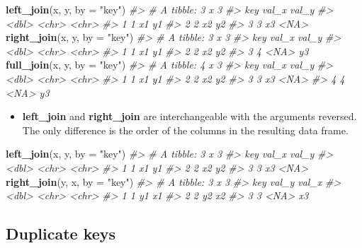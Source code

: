 \documentclass[]{book}
\newenvironment{Shaded}{\begin{snugshade}}{\end{snugshade}}
\newcommand{\CommentTok}[1]{\textcolor[rgb]{0.56,0.35,0.01}{\textit{#1}}}
\newcommand{\DataTypeTok}[1]{\textcolor[rgb]{0.13,0.29,0.53}{#1}}
\newcommand{\KeywordTok}[1]{\textcolor[rgb]{0.13,0.29,0.53}{\textbf{#1}}}
\newcommand{\NormalTok}[1]{#1}
\newcommand{\StringTok}[1]{\textcolor[rgb]{0.31,0.60,0.02}{#1}}
\newenvironment{rmdblock}[1]
  {\begin{shaded*}
  \begin{itemize}
  \renewcommand{\labelitemi}{
    \raisebox{-.7\height}[0pt][0pt]{
      {\setkeys{Gin}{width=3em,keepaspectratio}\texttt{[image: images/\#1]}}
    }
  }
  \item
  }
  {
  \end{itemize}
  \end{shaded*}
  }
\newenvironment{rmdnote}
  {\begin{rmdblock}{note}}
  {\end{rmdblock}}
\theoremstyle{definition}
\theoremstyle{definition}
\theoremstyle{definition}
\theoremstyle{remark}
\begin{document}
\begin{Shaded}
\begin{Highlighting}[]
\KeywordTok{left_join}\NormalTok{(x, y, }\DataTypeTok{by =} \StringTok{"key"}\NormalTok{)}
\CommentTok{#> # A tibble: 3 x 3}
\CommentTok{#>     key val_x val_y}
\CommentTok{#>   <dbl> <chr> <chr>}
\CommentTok{#> 1     1 x1    y1   }
\CommentTok{#> 2     2 x2    y2   }
\CommentTok{#> 3     3 x3    <NA>}
\KeywordTok{right_join}\NormalTok{(x, y, }\DataTypeTok{by =} \StringTok{"key"}\NormalTok{)}
\CommentTok{#> # A tibble: 3 x 3}
\CommentTok{#>     key val_x val_y}
\CommentTok{#>   <dbl> <chr> <chr>}
\CommentTok{#> 1     1 x1    y1   }
\CommentTok{#> 2     2 x2    y2   }
\CommentTok{#> 3     4 <NA>  y3}
\KeywordTok{full_join}\NormalTok{(x, y, }\DataTypeTok{by =} \StringTok{"key"}\NormalTok{)}
\CommentTok{#> # A tibble: 4 x 3}
\CommentTok{#>     key val_x val_y}
\CommentTok{#>   <dbl> <chr> <chr>}
\CommentTok{#> 1     1 x1    y1   }
\CommentTok{#> 2     2 x2    y2   }
\CommentTok{#> 3     3 x3    <NA> }
\CommentTok{#> 4     4 <NA>  y3}
\end{Highlighting}
\end{Shaded}

\begin{rmdnote}
\textbf{left\_join} and \textbf{right\_join} are interchangeable with
the arguments reversed. The only difference is the order of the columns
in the resulting data frame.
\end{rmdnote}

\begin{Shaded}
\begin{Highlighting}[]
\KeywordTok{left_join}\NormalTok{(x, y, }\DataTypeTok{by =} \StringTok{"key"}\NormalTok{)}
\CommentTok{#> # A tibble: 3 x 3}
\CommentTok{#>     key val_x val_y}
\CommentTok{#>   <dbl> <chr> <chr>}
\CommentTok{#> 1     1 x1    y1   }
\CommentTok{#> 2     2 x2    y2   }
\CommentTok{#> 3     3 x3    <NA>}
\KeywordTok{right_join}\NormalTok{(y, x, }\DataTypeTok{by =} \StringTok{"key"}\NormalTok{)}
\CommentTok{#> # A tibble: 3 x 3}
\CommentTok{#>     key val_y val_x}
\CommentTok{#>   <dbl> <chr> <chr>}
\CommentTok{#> 1     1 y1    x1   }
\CommentTok{#> 2     2 y2    x2   }
\CommentTok{#> 3     3 <NA>  x3}
\end{Highlighting}
\end{Shaded}

\hypertarget{duplicate-keys}{%
\subsection{Duplicate keys}\label{duplicate-keys}}
\end{document}
